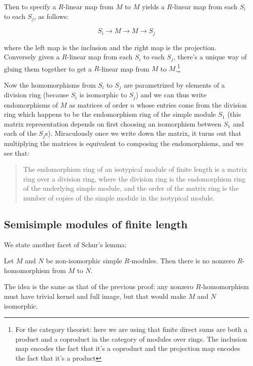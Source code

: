 \documentclass[a4paper]{amsart}
\begin{document}
Then to specify a $R$-linear map from $M$ to $M$ yields a $R$-linear
map from each $S_i$ to each $S_j$, as follows:

$$S_i \to M \to M \to S_j$$

where the left map is the inclusion and the right map is the
projection. Conversely given a $R$-linear map from each $S_i$ to each
$S_j$, there's a unique way of gluing them together to get a
$R$-linear map from $M$ to $M$.\footnote{For the category theorist:
  here we are using that finite direct sums are both a product and a
  coproduct in the category of modules over rings. The inclusion map
  encodes the fact that it's a coproduct and the projection map
  encodes the fact that it's a product}

Now the homomorphisms from $S_i$ to $S_j$ are parametrized by elements
of a division ring (because $S_i$ is isomorphic to $S_j$) and we can
thus write endomorphisms of $M$ as matrices of order $n$ whose entries
come from the division ring which happens to be the endomorphism ring
of the simple module $S_1$ (this matrix representation depends on
first choosing an isomorphism between $S_1$ and each of the
$S_j$s). Miraculously once we write down the matrix, it turns out that
multiplying the matrices is equivalent to composing the endomorphisms, and 
we see that:

\begin{quote}
  The endomorphism ring of an isotypical module of finite length is a
  matrix ring over a division ring, where the division ring is the
  endomorphism ring of the underlying simple module, and the order of
  the matrix ring is the number of copies of the simple module in the
  isotypical module.
\end{quote}

\subsection{Semisimple modules of finite length}

We state another facet of Schur's lemma:

\begin{theorem}
  Let $M$ and $N$ be non-isomorphic simple $R$-modules. Then there is
  no nonzero $R$-homomorphism from $M$ to $N$.
\end{theorem}

The idea is the same as that of the previous proof: any nonzero
$R$-homomorphism must have trivial kernel and full image, but that
would make $M$ and $N$ isomorphic.
\end{document}
